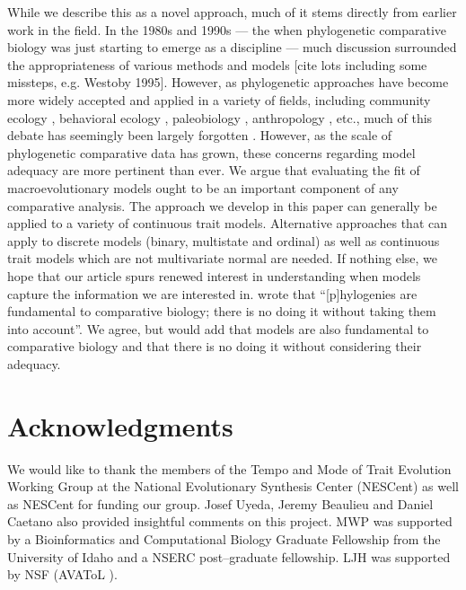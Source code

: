 \documentclass[12pt]{article}
\begin{document}
While we describe this as a novel approach, much of it stems directly from earlier work in the field. In the 1980s and 1990s --- the when phylogenetic comparative biology was just starting to emerge as a discipline --- much discussion surrounded the appropriateness of various methods and models [cite lots including some missteps, e.g. Westoby 1995]. However, as phylogenetic approaches have become more widely accepted and applied in a variety of fields, including community ecology \citep{Green1993, Webb2002, CB2009, Mayfield2010, PennellHarmon}, behavioral ecology \citep{something}, paleobiology \citep{something else}, anthropology \citep{Nunnbook}, etc., much of this debate has seemingly been largely forgotten \citep[but see][]{Losos2010}. However, as the scale of phylogenetic comparative data has grown, these concerns regarding model adequacy are more pertinent than ever. We argue that evaluating the fit of macroevolutionary models ought to be an important component of any comparative analysis. The approach we develop in this paper can generally be applied to a variety of continuous trait models. Alternative approaches that can apply to discrete models (binary, multistate and ordinal) as well as continuous trait models which are not multivariate normal are needed. If nothing else, we hope that our article spurs renewed interest in understanding when models capture the information we are interested in. \citet[][p. 14]{Felsenstein1985} wrote that ``[p]hylogenies are fundamental to comparative biology; there is no doing it without taking them into account''. We agree, but would add that models are also fundamental to comparative biology and that there is no doing it without considering their adequacy.


\section*{Acknowledgments}

We would like to thank the members of the Tempo and Mode of Trait Evolution Working Group at the National Evolutionary Synthesis Center (NESCent) as well as NESCent for funding our group. Josef Uyeda, Jeremy Beaulieu and Daniel Caetano also provided insightful comments on this project. MWP was supported by a Bioinformatics and Computational Biology Graduate Fellowship from the University of Idaho and a NSERC post--graduate fellowship. LJH was supported by NSF (AVAToL ).



\newpage


\end{document}
